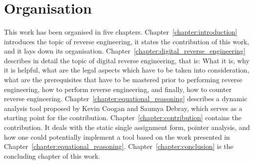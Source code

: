 \section{Organisation}
\paragraph{}
This work has been organised in five chapters. Chapter~\ref{chapter:introduction} introduces the topic of reverse engineering, it states the contribution of this work, and it lays down its organisation. Chapter~\ref{chapter:digital_reverse_engineering} describes in detail the topic of digital reverse engineering, that is: What it is, why it is helpful, what are the legal aspects which have to be taken into consideration, what are the prerequisites that have to be mastered prior to performing reverse engineering, how to perform reverse engineering, and finally, how to counter reverse engineering. Chapter~\ref{chapter:equational_reasoning} describes a dynamic analysis tool proposed by Kevin Coogan and Saumya Debray, which serves as a starting point for the contribution. Chapter~\ref{chapter:contribution} contains the contribution. It deals with the static single assignment form, pointer analysis, and how one could potentially implement a tool based on the work presented in Chapter~\ref{chapter:equational_reasoning}. Chapter~\ref{chapter:conclusion} is the concluding chapter of this work.

